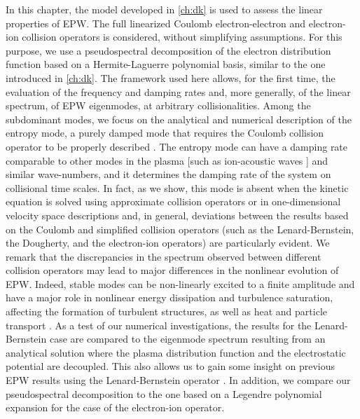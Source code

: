 In this chapter, the model developed in \cref{ch:dk} is used to assess the {linear} properties of EPW.
%
The full {linearized} Coulomb electron-electron and electron-ion collision operators is considered, without simplifying assumptions.
%
For this purpose, we use a pseudospectral decomposition of the electron distribution function based on a Hermite-Laguerre polynomial basis, similar to the one introduced in \cref{ch:dk}.
%
The framework used here allows, {for the first time}, the evaluation of the frequency and damping rates and, more {generally}, of the linear spectrum, of EPW eigenmodes, {at arbitrary collisionalities}.
%
Among the subdominant modes, we focus on the analytical and numerical description of the entropy mode, a purely damped mode that requires the Coulomb collision operator to be properly described \citep{Epperlein1994,Banks2016}.
%
{The entropy mode can have a damping rate comparable to other modes in the plasma [such as ion-acoustic waves \citep{Tracy1993a}] and similar wave-numbers, and it determines the damping rate of the system on collisional time scales.}
%
In fact, as we show, this mode is absent when the kinetic equation is solved using approximate collision operators or in one-dimensional velocity space descriptions and, in general, deviations between the results based on the Coulomb and simplified collision operators (such as the Lenard-Bernstein, the Dougherty, and the electron-ion operators) are particularly evident.
%
We remark that the discrepancies in the spectrum observed between {different} collision operators may lead to major differences in the nonlinear evolution of EPW.
%
Indeed, stable modes can be non-linearly excited to a finite amplitude and have a major role in nonlinear energy dissipation and turbulence saturation, affecting the formation of turbulent structures, as well as heat and particle transport \citep{Terry2006,Hatch2011}.
%
As a test of our numerical investigations, the results for the Lenard-Bernstein case are compared to the eigenmode spectrum resulting from an analytical solution where the plasma distribution function and the electrostatic potential are decoupled.
%
This also allows us to gain some insight on previous EPW results using the Lenard-Bernstein operator \citep{Bratanov2013,Schekochihin2016}.
%
In addition, we compare our pseudospectral decomposition to the one based on a Legendre polynomial expansion for the case of the electron-ion operator.

